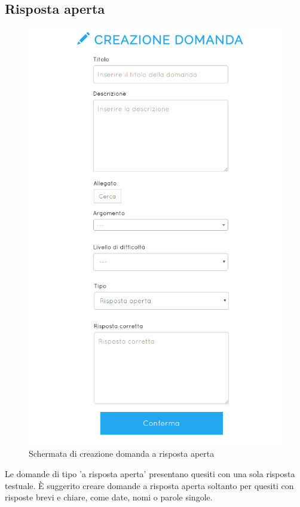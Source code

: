 \documentclass[a4paper, titlepage]{article}
\begin{document}
	 \subsection{Risposta aperta}
	 \begin{figure}[!h]
	 	\centering
	 	\includegraphics[scale=0.33]{Img/screen_CreazioneDomandaAperta.png}
	 	\caption{Schermata di creazione domanda a risposta aperta}
	 \end{figure}
	 Le domande di tipo 'a risposta aperta' presentano quesiti con una sola risposta testuale. È suggerito creare domande a risposta aperta soltanto per quesiti con risposte brevi e chiare, come date, nomi o parole singole. 
\end{document}
